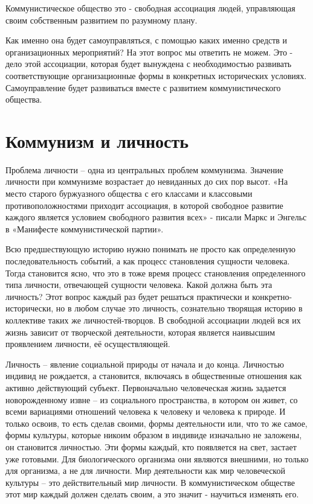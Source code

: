\documentclass[12pt,a4paper,openany]{book}
\begin{document}
Коммунистическое общество это - свободная ассоциация людей, управляющая своим собственным развитием по разумному плану.

Как именно она будет самоуправляться, с помощью каких именно средств и организационных мероприятий? На этот вопрос мы ответить не можем. Это - дело этой ассоциации, которая будет вынуждена с необходимостью развивать соответствующие организационные формы в конкретных исторических условиях. Самоуправление будет развиваться вместе с развитием коммунистического общества.
\ifSubfilesClassLoaded{\setcounter{page}{47}}{}
\section{Коммунизм и личность}
\label{sec:08_kommunizm_lichnost}

Проблема личности – одна из центральных проблем коммунизма. Значение личности при коммунизме возрастает до невиданных до сих пор высот. «На место старого буржуазного общества с его классами и классовыми противоположностями приходит ассоциация, в которой свободное развитие каждого является условием свободного развития всех» - писали Маркс и Энгельс в «Манифесте коммунистической партии».

Всю предшествующую историю нужно понимать не просто как определенную последовательность событий, а как процесс становления сущности человека. Тогда становится ясно, что это в тоже время процесс становления определенного типа личности, отвечающей сущности человека. Какой должна быть эта личность? Этот вопрос каждый раз будет решаться практически и конкретно-исторически, но в любом случае это личность, сознательно творящая историю в коллективе таких же личностей-творцов. В свободной ассоциации людей вся их жизнь зависит от творческой деятельности, которая является наивысшим проявлением личности, её осуществляющей.

Личность – явление социальной природы от начала и до конца. Личностью индивид не рождается, а становится, включаясь в общественные отношения как активно действующий субъект. Первоначально человеческая жизнь задается новорожденному извне – из социального пространства, в котором он живет, со всеми вариациями отношений человека к человеку и человека к природе. И только освоив, то есть сделав своими, формы деятельности или, что то же самое, формы культуры, которые никоим образом в индивиде изначально не заложены, он становится личностью. Эти формы каждый, кто появляется на свет, застает уже готовыми. Для биологического организма они являются внешними, но только для организма, а не для личности. Мир деятельности как мир человеческой культуры – это действительный мир личности. В коммунистическом обществе этот мир каждый должен сделать своим, а это значит - научиться изменять его.
\end{document}
